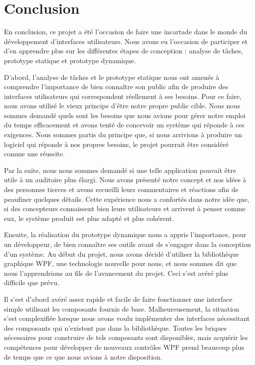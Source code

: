 \documentclass[letterpaper, oneside, 12pt, these, creativecommons]{thETS}
\begin{document}
\chapter{Conclusion}

En conclusion, ce projet a été l'occasion de faire une incartade dans le monde du développement d'interfaces utilisateurs. Nous avons eu l'occasion de participer et d'en apprendre plus sur les différentes étapes de conception : analyse de tâches, prototype statique et prototype dynamique.

D'abord, l'analyse de tâches et le prototype statique nous ont amenés à comprendre l'importance de bien connaître son public afin de produire des interfaces utilisateurs qui correspondent réellement à ses besoins. Pour ce faire, nous avons utilisé le vieux principe d'être notre propre public cible. Nous nous sommes demandé quels sont les besoins que nous avions pour gérer notre emploi du temps efficacement et avons tenté de concevoir un système qui réponde à ces exigences. Nous sommes partis du principe que, si nous arrivions à produire un logiciel qui réponde à nos propres besoins, le projet pourrait être considéré comme une réussite.

Par la suite, nous nous sommes demandé si une telle application pouvait être utile à un auditoire plus élargi. Nous avons présenté notre concept et nos idées à des personnes tierces et avons recueilli leurs commentaires et réactions afin de peaufiner quelques détails. Cette expérience nous a confortés dans notre idée que, si des concepteurs connaissent bien leurs utilisateurs et arrivent à penser comme eux, le système produit est plus adapté et plus cohérent.

Ensuite, la réalisation du prototype dynamique nous a appris l'importance, pour un développeur, de bien connaître ses outils avant de s'engager dans la conception d'un système. Au début du projet, nous avons décidé d'utiliser la bibliothèque graphique WPF, une technologie nouvelle pour nous, et nous sommes dit que nous l'apprendrions au fils de l'avancement du projet. Ceci s'est avéré plus difficile que prévu.

Il s'est d'abord avéré assez rapide et facile de faire fonctionner une interface simple utilisant les composants fournis de base. Malheureusement, la situation s'est complexifiée lorsque nous avons voulu implémenter des interfaces nécessitant des composants qui n'existent pas dans la bibliothèque. Toutes les briques nécessaires pour construire de tels composants sont disponibles, mais acquérir les compétences pour développer de nouveaux contrôles WPF prend beaucoup plus de temps que ce que nous avions à notre disposition.
\end{document}
